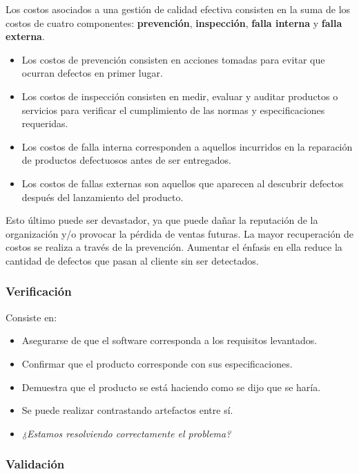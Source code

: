     Los costos asociados a una gestión de calidad efectiva consisten en la suma de los costos de cuatro componentes: \textbf{prevención}, \textbf{inspección}, \textbf{falla interna} y \textbf{falla externa}.
    
    \begin{itemize}
        \item Los costos de prevención consisten en acciones tomadas para evitar que ocurran defectos en primer lugar.
        \item Los costos de inspección consisten en medir, evaluar y auditar productos o servicios para verificar el cumplimiento de las normas y especificaciones requeridas.
        \item Los costos de falla interna corresponden a aquellos incurridos en la reparación de productos defectuosos antes de ser entregados.
        \item Los costos de fallas externas son aquellos que aparecen al descubrir defectos después del lanzamiento del producto.
    \end{itemize}
    
    Esto último puede ser devastador, ya que puede dañar la reputación de la organización y/o provocar la pérdida de ventas futuras. La mayor recuperación de costos se realiza a través de la prevención. Aumentar el énfasis en ella reduce la cantidad de defectos que pasan al cliente sin ser detectados.
    
    \subsubsection*{Verificación}
    Consiste en:
        \begin{itemize}
            \item Asegurarse de que el software corresponda a los requisitos levantados.
            \item Confirmar que el producto corresponde con sus especificaciones.
            \item Demuestra que el producto se está haciendo como se dijo que se haría.
            \item Se puede realizar contrastando artefactos entre sí.
            \item \textit{¿Estamos resolviendo correctamente el problema?}
        \end{itemize}
    
    \subsubsection*{Validación}
    
